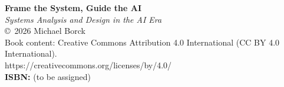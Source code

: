 \thispagestyle{empty}
\vspace*{2in}
\begin{center}
\textbf{\large Frame the System, Guide the AI}\\[0.3em]
\textit{Systems Analysis and Design in the AI Era}\\[1em]
\copyright\ 2026 Michael Borck\\[0.5em]
Book content: Creative Commons Attribution 4.0 International (CC BY 4.0 International).\\
https://creativecommons.org/licenses/by/4.0/\\[1em]
\textbf{ISBN:} (to be assigned)\\[1em]
\end{center}
\clearpage
